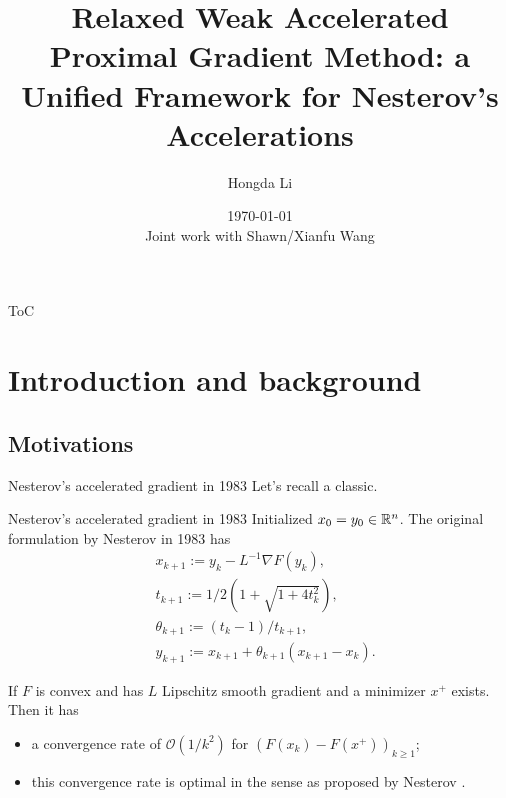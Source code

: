 \documentclass[11pt]{beamer}
\author[Hongda Li]{Hongda Li}
\title{
    Relaxed Weak Accelerated Proximal Gradient Method: a Unified Framework for Nesterov's Accelerations
}
\institute[UBCO]{
    University of British Columbia Okanagan
}
\date[\today]{\today \\ \vspace{1cm} \tiny{Joint work with Shawn/Xianfu Wang}}
\theoremstyle{definition}
\begin{document}
\begin{frame}
    \titlepage
\end{frame}

\begin{frame}{ToC}
    \tableofcontents
\end{frame}

\section{Introduction and background}
    \subsection{Motivations}
        \begin{frame}{Nesterov's accelerated gradient in 1983}
            Let's recall a classic. 
            \begin{block}{Nesterov's accelerated gradient in 1983}
                Initialized $x_0 = y_0 \in \mathbb R^n$. 
                The original formulation by Nesterov in 1983 \cite{nesterov_method_1983} has
                {\small
                \begin{align*}
                    & x_{k + 1} := y_k - L^{-1}\nabla F(y_k),
                    \\
                    & t_{k + 1} := 1/2\left(1 + \sqrt{1 + 4t_{k}^2}\right),
                    \\
                    & \theta_{k + 1} := (t_{k} - 1)/t_{k + 1}, \label{eqn:example-algorithm}
                    \\
                    & y_{k + 1} := x_{k + 1} + \theta_{k + 1}(x_{k + 1} - x_k).
                \end{align*}    
                }
            \end{block}
            If $F$ is convex and has $L$ Lipschitz smooth gradient and a minimizer $x^+$ exists. 
            Then it has
            \begin{itemize}
                \item a convergence rate of $\mathcal O(1/k^2)$ for $(F(x_k) - F(x^+))_{k \ge 1}$;
                \item this convergence rate is optimal in the sense as proposed by Nesterov \cite{nesterov_lectures_2018}.
            \end{itemize}
        \end{frame}
\end{document}
